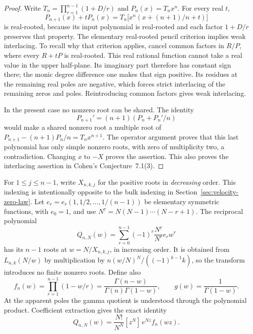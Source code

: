 \begin{proof}
Write $T_n=\prod_{r=1}^{n-1}(1+D/r)$ and $P_n(x)=T_nx^n$.
For every real $t$,
\[
 P_{n+1}(x)+tP_n(x)
    =T_n\bigl[x^n(x+(n+1)/n+t)\bigr]
\]
is real-rooted, because its input polynomial is real-rooted and
each factor $1+D/r$ preserves that property.  The elementary
real-rooted pencil criterion implies weak interlacing.
To recall why that criterion applies, cancel common factors in
$R/P$, where every $R+tP$ is real-rooted.  This real rational
function cannot take a real value in the upper half-plane.  Its
imaginary part therefore has constant sign there; the monic degree
difference one makes that sign positive.  Its residues at the
remaining real poles are negative, which forces strict interlacing
of the remaining zeros and poles.  Reintroducing common factors
gives weak interlacing.

In the present case no nonzero root can be shared.  The identity
\[
 P_{n+1}'=(n+1)(P_n+P_n'/n)
\]
would make a shared nonzero root a multiple root of
$P_{n+1}-(n+1)P_n/n=T_nx^{n+1}$.  The operator argument proves that
this last polynomial has only simple nonzero roots, with zero
of multiplicity two, a contradiction.  Changing $x$ to $-X$
proves the assertion.  This also proves the interlacing assertion
in Cohen's Conjecture~7.1(3).
\end{proof}

For $1\leq j\leq n-1$, write $X_{n,k,j}$ for the positive roots in
\emph{decreasing} order.  This indexing is intentionally opposite to
the bulk indexing in Section~\ref{sec:velocity-zero-law}.
Let $e_r=e_r(1,1/2,\ldots,1/(n-1))$ be elementary symmetric functions,
with $e_0=1$, and use $N^{\underline r}=N(N-1)\cdots(N-r+1)$.
The reciprocal polynomial
\begin{equation}\label{eq:reciprocal-lambert-polynomial}
 Q_{n,N}(w)=\sum_{r=0}^{n-1}(-1)^r
       \frac{N^{\underline r}}{N^r}e_r w^r
\end{equation}
has its $n-1$ roots at $w=N/X_{n,k,j}$, in increasing order.
It is obtained from $L_{n,k}(N/w)$ by multiplication by
$n(w/N)^N/((-1)^{k-1}k)$, so the transform introduces no finite
nonzero roots.  Define also
\begin{equation}\label{eq:gamma-product-fn}
 f_n(w)=\prod_{r=1}^{n-1}(1-w/r)
       =\frac{\Gamma(n-w)}{\Gamma(n)\Gamma(1-w)},\qquad
 g(w)=\frac1{\Gamma(1-w)}.
\end{equation}
At the apparent poles the gamma quotient is understood through the
polynomial product.  Coefficient extraction gives the exact identity
\begin{equation}\label{eq:reciprocal-coefficient-integral}
 Q_{n,N}(w)=\frac{N!}{N^N}[z^N]\,e^{Nz}f_n(wz).
\end{equation}

